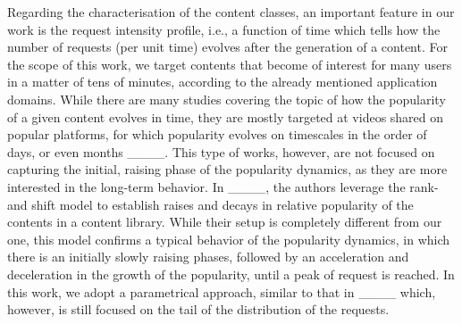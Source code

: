 Regarding the characterisation of the content classes, an important
feature in our work is the request intensity profile, i.e., a function
of time which tells how the number of requests (per unit time) evolves
after the generation of a content. For the scope of this work, we
target contents that become of interest for many users in a matter
of tens of minutes, according to the already mentioned application
domains. While there are many studies covering the topic of how the
popularity of a given content evolves in time, they are mostly targeted
at videos shared on popular platforms, for which popularity evolves
on timescales in the order of days, or even months ____.
This type of works, however, are not focused on capturing the initial,
raising phase of the popularity dynamics, as they are more interested
in the long-term behavior. In ____, the authors leverage
the rank-and shift model to establish raises and decays in relative
popularity of the contents in a content library. While their setup
is completely different from our one, this model confirms a typical
behavior of the popularity dynamics, in which there is an initially
slowly raising phases, followed by an acceleration and deceleration
in the growth of the popularity, until a peak of request is reached.
In this work, we adopt a parametrical approach, similar to that in
____ which, however, is still focused on the tail
of the distribution of the requests.